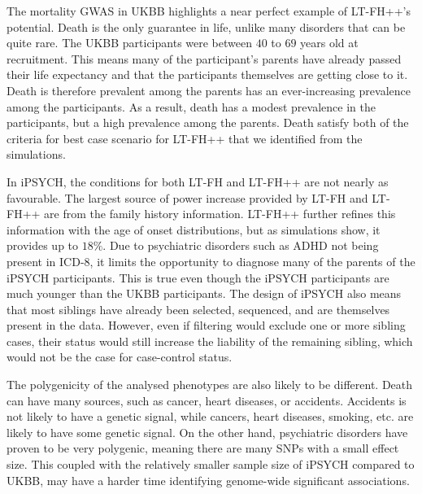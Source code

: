The mortality GWAS in UKBB highlights a near perfect example of LT-FH++'s potential. Death is the only guarantee in life, unlike many disorders that can be quite rare. The UKBB participants were between $ 40 $ to $ 69 $ years old at recruitment. This means many of the participant's parents have already passed their life expectancy and that the participants themselves are getting close to it. Death is therefore prevalent among the parents has an ever-increasing prevalence among the participants. As a result, death has a modest prevalence in the participants, but a high prevalence among the parents. Death satisfy both of the criteria for best case scenario for LT-FH++ that we identified from the simulations. 

In iPSYCH, the conditions for both LT-FH and LT-FH++ are not nearly as favourable. The largest source of power increase provided by LT-FH and LT-FH++ are from the family history information. LT-FH++ further refines this information with the age of onset distributions, but as simulations show, it provides up to $ 18\% $. Due to psychiatric disorders such as ADHD not being present in ICD-8, it limits the opportunity to diagnose many of the parents of the iPSYCH participants. This is true even though the iPSYCH participants are much younger than the UKBB participants. The design of iPSYCH also means that most siblings have already been selected, sequenced, and are themselves present in the data. However, even if filtering would exclude one or more sibling cases, their status would still increase the liability of the remaining sibling, which would not be the case for case-control status.

The polygenicity of the analysed phenotypes are also likely to be different. Death can have many sources, such as cancer, heart diseases, or accidents. Accidents is not likely to have a genetic signal, while cancers, heart diseases, smoking, etc. are likely to have some genetic signal. On the other hand, psychiatric disorders have proven to be very polygenic, meaning there are many SNPs with a small effect size. This coupled with the relatively smaller sample size of iPSYCH compared to UKBB, may have a harder time identifying genome-wide significant associations.

